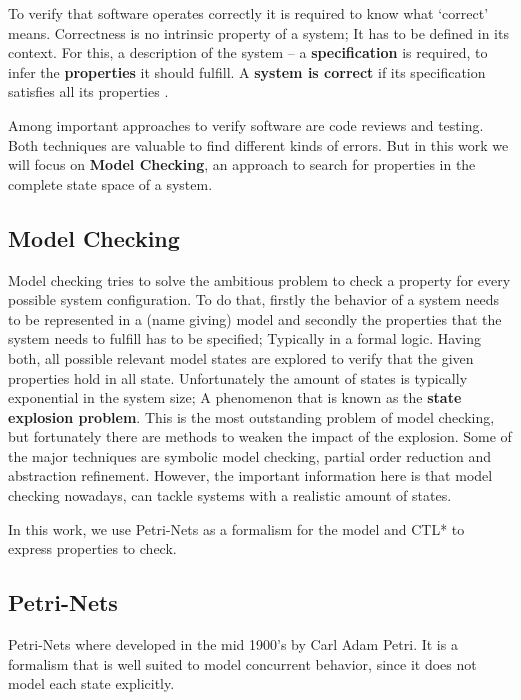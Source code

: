 To verify that software operates correctly it is required to know what `correct' means.
Correctness is no intrinsic property of a system;
It has to be defined in its context.
For this, a description of the system -- a \textbf{specification} is required, to infer the \textbf{properties} it should fulfill.
A \textbf{system is correct} if its specification satisfies all its properties \cite[Chapter 1]{baier2008principles}.

Among important approaches to verify software are code reviews and testing.
Both techniques are valuable to find different kinds of errors.
But in this work we will focus on \textbf{Model Checking}, an approach to search for properties in the complete state space of a system.

\subsection{Model Checking}
Model checking tries to solve the ambitious problem to check a property for every possible system configuration.
To do that, firstly the behavior of a system needs to be represented in a (name giving) model
and secondly the properties that the system needs to fulfill has to be specified;
Typically in a formal logic.
Having both, all possible relevant model states are explored to verify that the given properties hold in all state.
Unfortunately the amount of states is typically exponential in the system size;
A phenomenon that is known as the \textbf{state explosion problem}\cite[Introduction]{mcmillan1993symbolic}.
This is the most outstanding problem of model checking, but fortunately there are methods to weaken the impact of the explosion.
Some of the major techniques are symbolic model checking, partial order reduction and abstraction refinement\cite[Chapter 5]{clarke2011model}.
However, the important information here is that model checking nowadays, can tackle systems with a realistic amount of states.

In this work, we use Petri-Nets as a formalism for the model and CTL* to express properties to check.

\subsection{Petri-Nets}
\label{rel_petri}
Petri-Nets where developed in the mid 1900's by Carl Adam Petri\cite{petri1962kommunikation}.
It is a formalism that is well suited to model concurrent behavior, since it does not model each state explicitly.

